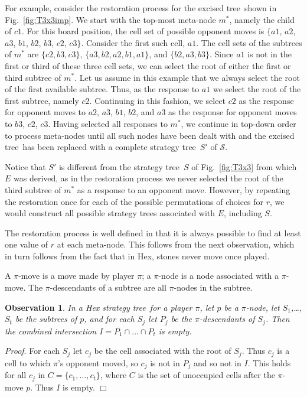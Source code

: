 \documentclass{llncs}
\def\stt{strategy tree}
\def\exct{excised tree}
\def\calS{\mbox{$\mathcal S$}}
\def\endofproof{\hfill $\Box$}
\newtheorem{observation}[theorem]{Observation}
\begin{document}
For example, consider the restoration process
for the \exct\ shown in Fig.~\ref{fig:T3x3imp}.
We start with the top-most meta-node $m^*$,
namely the child of $c1$.
For this board position,
the cell set of possible opponent moves
is $\{a1$, $a2$, $a3$, $b1$, $b2$, $b3$, $c2$, $c3\}$.
Consider the first such cell, $a1$.
The cell sets of the subtrees of $m^*$ are 
$\{c2,b3,c3\}$,
$\{a3,b2,a2,b1,a1\}$, and
$\{b2,a3,b3\}$.
Since $a1$ is not in the first or third 
of these three cell sets, we can select
the root of either the first or third subtree of $m^*$.
Let us assume in this example that we always
select the root of the first available subtree.
Thus, as the response to $a1$ we select the root
of the first subtree, namely $c2$.
Continuing in this fashion, 
we select $c2$ as the response for
opponent moves to $a2$, $a3$, $b1$, $b2$,
and $a3$ as the response for opponent moves
to $b3$, $c2$, $c3$.
Having selected all responses to $m^*$,
we continue in top-down order to process meta-nodes
until all such nodes have been dealt with and the 
\exct\ has been replaced with a complete \stt\ $S'$ of \calS.

Notice that $S'$ is different from the \stt\ $S$
of Fig.~\ref{fig:T3x3} from which $E$ was derived,
as in the restoration process
we never selected the root of the third subtree of $m^*$
as a response to an opponent move.
However, by repeating the restoration once for each
of the possible permutations of choices for $r$,
we would construct all possible \stt s associated with $E$,
including $S$.

The restoration process is well defined in that it is always possible 
to find at least one value of $r$ at each meta-node.  
This follows from the next observation,
which in turn follows from the fact that in Hex, 
stones never move once played.

A $\pi$-move is a move made by player $\pi$;
a $\pi$-node is a node associated with a $\pi$-move.
The $\pi$-descendants of a subtree are all $\pi$-nodes in the subtree.

\begin{observation}
In a Hex \stt\ for a player $\pi$,
let $p$ be a $\pi$-node,
let $S_1$,\ldots,$S_t$ be the subtrees of $p$,
and for each $S_j$ let $P_j$ be the $\pi$-descendants of $S_j$.
Then the combined intersection $I=P_1\cap \ldots \cap P_t$ is empty.
\end{observation}

{\it Proof}.
For each $S_j$ let $c_j$ be the 
cell associated with the root of $S_j$.
Thus $c_j$ is a cell to which $\pi$'s opponent moved,
so $c_j$ is not in $P_j$ and so not in $I$.
This holds for all $c_j$ in $C=\{c_1,\ldots,c_t\}$,
where $C$ is the set of unoccupied cells after the $\pi$-move $p$.
Thus $I$ is empty.
\endofproof
\end{document}
